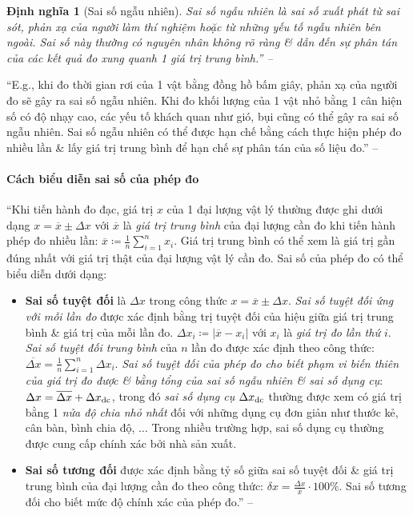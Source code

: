 \documentclass{article}
\numberwithin{equation}{section}
\newtheorem{dinhnghia}{Định nghĩa}[section]
\begin{document}
\begin{dinhnghia}[Sai số ngẫu nhiên]
	\emph{Sai số ngẫu nhiên} là sai số xuất phát từ sai sót, phản xạ của người làm thí nghiệm hoặc từ những yếu tố ngẫu nhiên bên ngoài. Sai số này thường có nguyên nhân không rõ ràng \& dẫn đến sự phân tán của các kết quả đo xung quanh 1 giá trị trung bình.'' -- \cite[p. 19]{SGK_Vat_Ly_10_Chan_Troi_Sang_Tao}
\end{dinhnghia}
``E.g., khi đo thời gian rơi của 1 vật bằng đồng hồ bấm giây, phản xạ của người đo sẽ gây ra sai số ngẫu nhiên. Khi đo khối lượng của 1 vật nhỏ bằng 1 cân hiện số có độ nhạy cao, các yếu tố khách quan như gió, bụi cũng có thể gây ra sai số ngẫu nhiên. Sai số ngẫu nhiên có thể được hạn chế bằng cách thực hiện phép đo nhiều lần \& lấy giá trị trung bình để hạn chế sự phân tán của số liệu đo.'' -- \cite[p. 20]{SGK_Vat_Ly_10_Chan_Troi_Sang_Tao}

\paragraph{Cách biểu diễn sai số của phép đo}
``Khi tiến hành đo đạc, giá trị $x$ của 1 đại lượng vật lý thường được ghi dưới dạng $x = \overline{x}\pm\Delta x$ với $\overline{x}$ là \textit{giá trị trung bình} của đại lượng cần đo khi tiến hành phép đo nhiều lần: $\overline{x}\coloneqq\frac{1}{n}\sum_{i=1}^n x_i$.  Giá trị trung bình có thể xem là giá trị gần đúng nhất với giá trị thật của đại lượng vật lý cần đo. Sai số của phép đo có thể biểu diễn dưới dạng:
\begin{itemize}
	\item \textbf{Sai số tuyệt đối} là $\Delta x$ trong công thức $x = \overline{x}\pm\Delta x$. \textit{Sai số tuyệt đối ứng với mỗi lần đo} được xác định bằng trị tuyệt đối của hiệu giữa giá trị trung bình \& giá trị của mỗi lần đo. $\Delta x_i\coloneqq|\overline{x} - x_i|$ với $x_i$ là \textit{giá trị đo lần thứ $i$}. \textit{Sai số tuyệt đối trung bình} của $n$ lần đo được xác định theo công thức: $\overline{\Delta x} = \frac{1}{n}\sum_{i=1}^n \Delta x_i$. \textit{Sai số tuyệt đối của phép đo cho biết phạm vi biến thiên của giá trị đo được \& bằng tổng của sai số ngẫu nhiên \& sai số dụng cụ}: $\Delta x = \overline{\Delta x} + \Delta x_{\rm dc}$, trong đó \textit{sai số dụng cụ} $\Delta x_{\rm dc}$ thường được xem có giá trị bằng 1 \textit{nửa độ chia nhỏ nhất} đối với những dụng cụ đơn giản như thước kẻ, cân bàn, bình chia độ, $\ldots$ Trong nhiều trường hợp, sai số dụng cụ thường được cung cấp chính xác bởi nhà sản xuất.
	\item \textbf{Sai số tương đối} được xác định bằng tỷ số giữa sai số tuyệt đối \& giá trị trung bình của đại lượng cần đo theo công thức: $\delta x = \frac{\Delta x}{\overline{x}}\cdot 100\%$. Sai số tương đối cho biết mức độ chính xác của phép đo.'' -- \cite[p. 21]{SGK_Vat_Ly_10_Chan_Troi_Sang_Tao}
\end{itemize}
\end{document}
